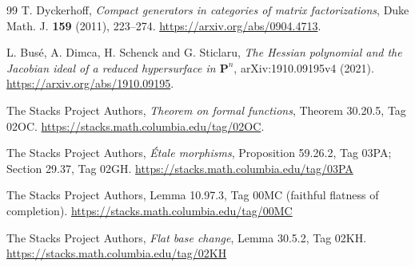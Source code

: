 \documentclass[a4paper,11pt]{ltjsarticle}
\theoremstyle{definition}
\begin{document}
\begin{thebibliography}{99}
T. Dyckerhoff,
\emph{Compact generators in categories of matrix factorizations},
Duke Math. J. \textbf{159} (2011), 223--274.
\url{https://arxiv.org/abs/0904.4713}.

L. Bus\'e, A. Dimca, H. Schenck and G. Sticlaru,
\emph{The Hessian polynomial and the Jacobian ideal of a reduced
hypersurface in $\mathbf P^n$}, arXiv:1910.09195v4 (2021).
\url{https://arxiv.org/abs/1910.09195}.

The Stacks Project Authors,
\emph{Theorem on formal functions}, Theorem 30.20.5, Tag 02OC.
\url{https://stacks.math.columbia.edu/tag/02OC}.


The Stacks Project Authors,
\emph{\'Etale morphisms}, Proposition 59.26.2, Tag 03PA;
Section 29.37, Tag 02GH.
\url{https://stacks.math.columbia.edu/tag/03PA}

The Stacks Project Authors,
Lemma 10.97.3, Tag 00MC (faithful flatness of completion).
\url{https://stacks.math.columbia.edu/tag/00MC}

The Stacks Project Authors,
\emph{Flat base change}, Lemma 30.5.2, Tag 02KH.
\url{https://stacks.math.columbia.edu/tag/02KH}

\end{thebibliography}
\end{document}
